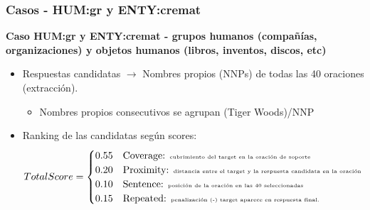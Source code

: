 \begin{frame}
\frametitle{Casos - HUM:gr y ENTY:cremat}
\textbf{Caso HUM:gr y ENTY:cremat - grupos humanos (compañías, organizaciones) y objetos humanos (libros, inventos, discos, etc)} \newline
  \begin{itemize}
    \item Respuestas candidatas $\rightarrow$ Nombres propios (NNPs) de todas las 40 oraciones (extracción).
      \begin{itemize}
        \item Nombres propios consecutivos se agrupan (Tiger Woods)/NNP 
    \end{itemize}
    \item Ranking de las candidatas según scores: 
    \scriptsize{
    \begin{equation*}
        TotalScore = \begin{cases}
                   0.55     & \text{Coverage: \tiny{cubrimiento del target en la oración de soporte}}\\
                   0.20     & \text{Proximity: \tiny{distancia entre el target y la respuesta candidata en la oración}}\\
                   0.10     & \text{Sentence: \tiny{posición de la oración en las 40 seleccionadas}} \\
                   0.15     & \text{Repeated: \tiny{penalización (-) target aparece en respuesta final. }}\\
               \end{cases}
    \end{equation*}
    }
  \end{itemize}

\end{frame}



